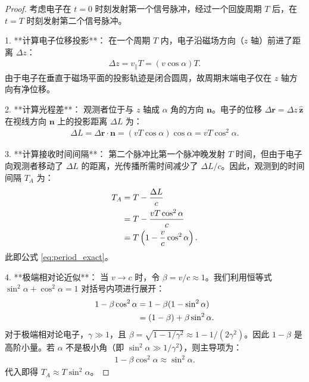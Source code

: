 \begin{proof}
考虑电子在 $t=0$ 时刻发射第一个信号脉冲，经过一个回旋周期 $T$ 后，在 $t=T$ 时刻发射第二个信号脉冲。

1. **计算电子位移投影**：
   在一个周期 $T$ 内，电子沿磁场方向（$z$ 轴）前进了距离 $\Delta z$：
   \begin{align}
       \Delta z = v_{\parallel} T = (v \cos\alpha) T.
   \end{align}
   由于电子在垂直于磁场平面的投影轨迹是闭合圆周，故周期末端电子仅在 $z$ 轴方向有净位移。

2. **计算光程差**：
   观测者位于与 $z$ 轴成 $\alpha$ 角的方向 $\mathbf{n}$。电子的位移 $\Delta \mathbf{r} = \Delta z \, \hat{\mathbf{z}}$ 在视线方向 $\mathbf{n}$ 上的投影距离 $\Delta L$ 为：
   \begin{align}
       \Delta L = \Delta \mathbf{r} \cdot \mathbf{n} = (v T \cos\alpha) \cos\alpha = v T \cos^2\alpha.
   \end{align}

3. **计算接收时间间隔**：
   第二个脉冲比第一个脉冲晚发射 $T$ 时间，但由于电子向观测者移动了 $\Delta L$ 的距离，光传播所需时间减少了 $\Delta L / c$。因此，观测到的时间间隔 $T_{A}$ 为：
   \begin{align}
       T_{A} &= T - \frac{\Delta L}{c} \notag \\
             &= T - \frac{v T \cos^2\alpha}{c} \notag \\
             &= T \left( 1 - \frac{v}{c} \cos^2\alpha \right).
   \end{align}
   此即公式 \eqref{eq:period_exact}。

4. **极端相对论近似**：
   当 $v \to c$ 时，令 $\beta = v/c \approx 1$。我们利用恒等式 $\sin^2\alpha + \cos^2\alpha = 1$ 对括号内项进行展开：
   \begin{align}
       1 - \beta \cos^2\alpha &= 1 - \beta (1 - \sin^2\alpha) \notag \\
                              &= (1 - \beta) + \beta \sin^2\alpha.
   \end{align}
   对于极端相对论电子，$\gamma \gg 1$，且 $\beta = \sqrt{1 - 1/\gamma^2} \approx 1 - 1/(2\gamma^2)$。因此 $1-\beta$ 是高阶小量。若 $\alpha$ 不是极小角（即 $\sin^2\alpha \gg 1/\gamma^2$），则主导项为：
   \begin{align}
       1 - \beta \cos^2\alpha \approx \sin^2\alpha.
   \end{align}
   代入即得 $T_{A} \approx T \sin^2\alpha$。
\end{proof}


